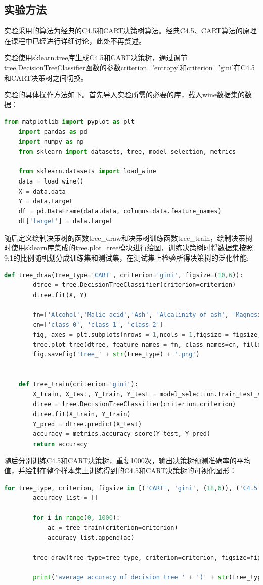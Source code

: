 \documentclass[12pt]{article}
\begin{document}
\subsection{实验方法}
实验采用的算法为经典的C4.5和CART决策树算法。经典C4.5、CART算法的原理在课程中已经进行详细讨论，此处不再赘述。\par
实验使用sklearn.tree库生成C4.5和CART决策树，通过调节tree.DecisionTreeClassifier函数的参数criterion='entropy'和criterion='gini'在C4.5和CART决策树之间切换。\par 
实验的具体操作方法如下。首先导入实验所需的必要的库，载入wine数据集的数据：
\begin{lstlisting}[language=python]
	from matplotlib import pyplot as plt
	import pandas as pd
	import numpy as np
	from sklearn import datasets, tree, model_selection, metrics
	
	from sklearn.datasets import load_wine
	data = load_wine()
	X = data.data
	Y = data.target
	df = pd.DataFrame(data.data, columns=data.feature_names)
	df['target'] = data.target
\end{lstlisting}
随后定义绘制决策树的函数tree\_draw和决策树训练函数tree\_train，绘制决策树时使用sklearn库集成的tree.plot\_tree模块进行绘图，训练决策树时将数据集按照9:1的比例随机划分成训练集和测试集，在测试集上检验所得决策树的泛化性能:
\begin{lstlisting}[language=python]
	def tree_draw(tree_type='CART', criterion='gini', figsize=(10,6)):
		dtree = tree.DecisionTreeClassifier(criterion=criterion)
		dtree.fit(X, Y)
	
		fn=['Alcohol','Malic acid','Ash', 'Alcalinity of ash', 'Magnesium', 'Total phenols', 'Flavanoids', 'Nonflavanoid phenols', 'Proanthocyanins', 'Color intensity', 'Hue', 'OD280/OD315 of diluted wines', 'Proline']
		cn=['class_0', 'class_1', 'class_2']
		fig, axes = plt.subplots(nrows = 1,ncols = 1,figsize = figsize, dpi=1000)
		tree.plot_tree(dtree, feature_names = fn, class_names=cn, filled = True, rounded = True);
		fig.savefig('tree_' + str(tree_type) + '.png')
	
	
	def tree_train(criterion='gini'):
		X_train, X_test, Y_train, Y_test = model_selection.train_test_split(df[data.feature_names], df['target'], test_size = 0.1)
		dtree = tree.DecisionTreeClassifier(criterion=criterion)
		dtree.fit(X_train, Y_train)
		Y_pred = dtree.predict(X_test)
		accuracy = metrics.accuracy_score(Y_test, Y_pred)
		return accuracy
\end{lstlisting}
随后分别训练C4.5和CART决策树，重复1000次，输出决策树预测准确率的平均值，并绘制在整个样本集上训练得到的C4.5和CART决策树的可视化图形：
\\
\begin{lstlisting}[language=python]
	for tree_type, criterion, figsize in [('CART', 'gini', (18,6)), ('C4.5', 'entropy', (10,6))]:
		accuracy_list = []
	
		for i in range(0, 1000):
			ac = tree_train(criterion=criterion)
			accuracy_list.append(ac)
	
		tree_draw(tree_type=tree_type, criterion=criterion, figsize=figsize)
	
		print('average accuracy of decision tree ' + '(' + str(tree_type) + '): ' + str("%.4f" % np.mean(accuracy_list)))
\end{lstlisting}
\end{document}
